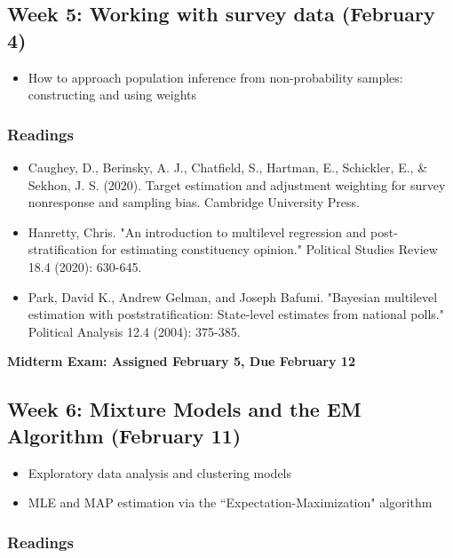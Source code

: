 \documentclass[11pt, article, oneside]{memoir}
\theoremstyle{Assumption}
\begin{document}
\subsection{Week 5: Working with survey data (February 4)}

\begin{itemize}
\item How to approach population inference from non-probability samples: constructing and using weights
\end{itemize}

\subsubsection*{Readings}

\begin{itemize}
\item Caughey, D., Berinsky, A. J., Chatfield, S., Hartman, E., Schickler, E., \& Sekhon, J. S. (2020). Target estimation and adjustment weighting for survey nonresponse and sampling bias. Cambridge University Press.
\item Hanretty, Chris. "An introduction to multilevel regression and post-stratification for estimating constituency opinion." Political Studies Review 18.4 (2020): 630-645.
\item Park, David K., Andrew Gelman, and Joseph Bafumi. "Bayesian multilevel estimation with poststratification: State-level estimates from national polls." Political Analysis 12.4 (2004): 375-385.
\end{itemize}

\textbf{Midterm Exam: Assigned February 5, Due February 12}

\subsection{Week 6: Mixture Models and the EM Algorithm (February 11)}

\begin{itemize}
\item Exploratory data analysis and clustering models
\item MLE and MAP estimation via the ``Expectation-Maximization" algorithm
\end{itemize}

\subsubsection*{Readings}
\end{document}
